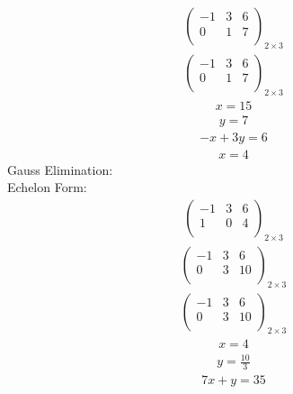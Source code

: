 \documentclass{article}
\begin{document}
\begin{align*}
\left(
\begin{array}{cc|c}
-1 & 3 & 6\\
0 & 1 & 7\\
\end{array}
\right)_{2\times 3}
\end{align*}
\begin{align*}
\left(
\begin{array}{cc|c}
-1 & 3 & 6\\
0 & 1 & 7\\
\end{array}
\right)_{2\times 3}
\end{align*}
\begin{align*}
x=15\end{align*}
\begin{align*}
y=7\end{align*}
\begin{align*}
-x + 3y=6\end{align*}
\begin{align*}
x=4\end{align*}
Gauss Elimination:\\
Echelon Form:\\
\begin{align*}
\left(
\begin{array}{cc|c}
-1 & 3 & 6\\
1 & 0 & 4\\
\end{array}
\right)_{2\times 3}
\end{align*}
\begin{align*}
\left(
\begin{array}{cc|c}
-1 & 3 & 6\\
0 & 3 & 10\\
\end{array}
\right)_{2\times 3}
\end{align*}
\begin{align*}
\left(
\begin{array}{cc|c}
-1 & 3 & 6\\
0 & 3 & 10\\
\end{array}
\right)_{2\times 3}
\end{align*}
\begin{align*}
x=4\end{align*}
\begin{align*}
y=\frac{10}{3}\end{align*}
\begin{align*}
7x + y=35\end{align*}
\end{document}

